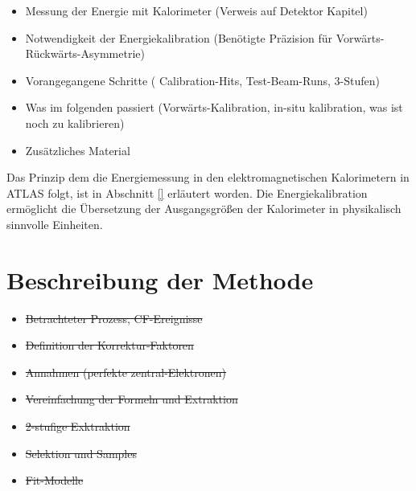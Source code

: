 \begin{itemize}
    \item Messung der Energie mit Kalorimeter (Verweis auf Detektor Kapitel)
    \item Notwendigkeit der Energiekalibration (Benötigte Präzision für 
        Vorwärts-Rückwärts-Asymmetrie)
    \item Vorangegangene Schritte ( Calibration-Hits, Test-Beam-Runs, 3-Stufen)
    \item Was im folgenden passiert (Vorwärts-Kalibration, in-situ
        kalibration, was ist noch zu kalibrieren)
    \item Zusätzliches Material
\end{itemize}

Das Prinzip dem die Energiemessung in den elektromagnetischen Kalorimetern in
ATLAS folgt, ist in Abschnitt \ref{}
erläutert worden. Die Energiekalibration ermöglicht die Übersetzung der
Ausgangsgrößen der Kalorimeter in physikalisch sinnvolle Einheiten.




%
\section{Beschreibung der Methode}
\label{energy_calibration:beschreibung_der_methode}

\begin{itemize}
    \item \sout{Betrachteter Prozess, CF-Ereignisse}
    \item \sout{Definition der Korrektur-Faktoren}
    \item \sout{Annahmen (perfekte zentral-Elektronen)}
    \item \sout{Vereinfachung der Formeln und Extraktion}
    \item \sout{2-stufige Exktraktion}
    \item \sout{Selektion und Samples}
    \item \sout{Fit-Modelle}
\end{itemize}

